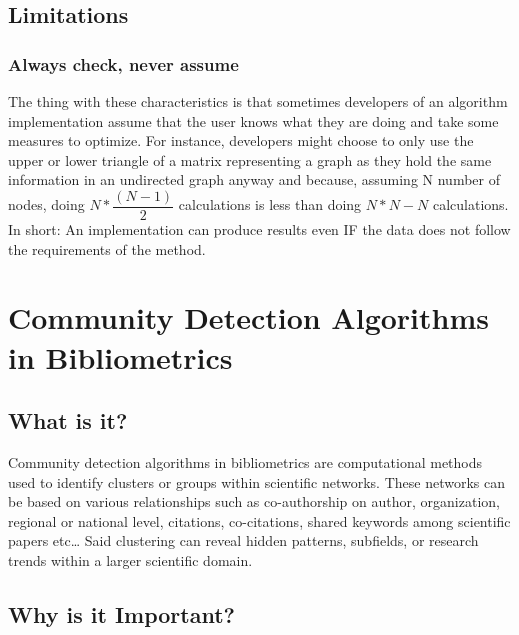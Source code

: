 \documentclass[
  letterpaper,
]{scrreprt}
\begin{document}
\section{Limitations}\label{limitations-11}

\subsection{Always check, never assume}\label{always-check-never-assume}

The thing with these characteristics is that sometimes developers of an
algorithm implementation assume that the user knows what they are doing
and take some measures to optimize. For instance, developers might
choose to only use the upper or lower triangle of a matrix representing
a graph as they hold the same information in an undirected graph anyway
and because, assuming N number of nodes, doing \(N*\dfrac{(N-1)}{2}\)
calculations is less than doing \(N*N-N\) calculations. In short: An
implementation can produce results even IF the data does not follow the
requirements of the method.

\chapter{Community Detection Algorithms in
Bibliometrics}\label{community-detection-algorithms-in-bibliometrics}

\section{What is it?}\label{what-is-it-4}

Community detection algorithms in bibliometrics are computational
methods used to identify clusters or groups within scientific networks.
These networks can be based on various relationships such as
co-authorship on author, organization, regional or national level,
citations, co-citations, shared keywords among scientific papers
etc\ldots{} Said clustering can reveal hidden patterns, subfields, or
research trends within a larger scientific domain.

\section{Why is it Important?}\label{why-is-it-important-11}
\end{document}
